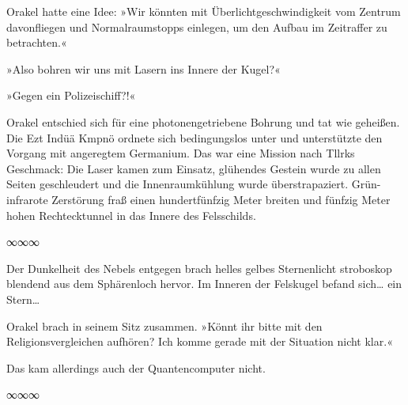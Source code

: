 Orakel hatte eine Idee: »Wir könnten mit Überlichtgeschwindigkeit vom Zentrum davonfliegen und Normalraumstopps einlegen, um den Aufbau im Zeitraffer zu betrachten.«


»Also bohren wir uns mit Lasern ins Innere der Kugel?«


»Gegen ein Polizeischiff?!«


Orakel entschied sich für eine photonengetriebene Bohrung und tat wie geheißen. Die Ezt Indüä Kmpnö ordnete sich bedingungslos unter und unterstützte den Vorgang mit angeregtem Germanium. Das war eine Mission nach Tllrks Geschmack: Die Laser kamen zum Einsatz, glühendes Gestein wurde zu allen Seiten geschleudert und die Innenraumkühlung wurde überstrapaziert. Grün-infrarote Zerstörung fraß einen hundertfünfzig Meter breiten und fünfzig Meter hohen Rechtecktunnel in das Innere des Felsschilds.

\begin{center}
∞∞∞
\end{center}

Der Dunkelheit des Nebels entgegen brach helles gelbes Sternenlicht stroboskop blendend aus dem Sphärenloch hervor. Im Inneren der Felskugel befand sich… ein Stern…


Orakel brach in seinem Sitz zusammen. »Könnt ihr bitte mit den Religionsvergleichen aufhören? Ich komme gerade mit der Situation nicht klar.«

Das kam allerdings auch der Quantencomputer nicht. 

\begin{center}
∞∞∞
\end{center}

